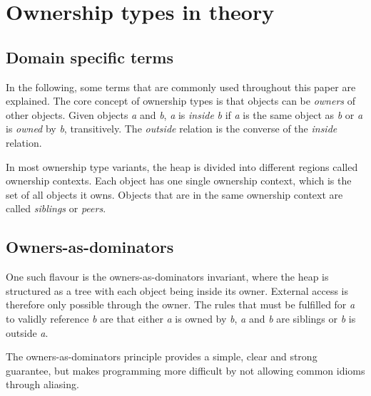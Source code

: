 \documentclass[sigplan,11pt,nonacm]{acmart}
\begin{document}

\section{Ownership types in theory}


\subsection{Domain specific terms}

In the following, some terms that are commonly used throughout this paper are explained.
The core concept of ownership types is that objects can be \emph{owners} of other objects.
Given objects \emph{a} and \emph{b}, \emph{a} is \emph{inside} \emph{b} if \emph{a} is the same object as \emph{b} or \emph{a} is \emph{owned} by \emph{b}, transitively.
The \emph{outside} relation is the converse of the \emph{inside} relation.

In most ownership type variants, the heap is divided into different regions called ownership contexts.
Each object has one single ownership context, which is the set of all objects it owns.
Objects that are in the same ownership context are called \emph{siblings} or \emph{peers}.
\cite{ownership-types-survey}


\subsection{Owners-as-dominators}

One such flavour is the owners-as-dominators\cite{ownership-types-survey} invariant, where the heap is structured as a tree with each object being inside its owner.
External access is therefore only possible through the owner.
The rules that must be fulfilled for \emph{a} to validly reference \emph{b} are that either \emph{a} is owned by \emph{b}, \emph{a} and \emph{b} are siblings or \emph{b} is outside \emph{a}.

The owners-as-dominators principle provides a simple, clear and strong guarantee, but makes programming more difficult by not allowing common idioms through aliasing.
\cite{ownership-types-survey}
\end{document}
